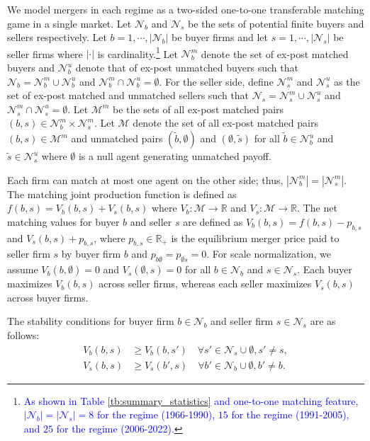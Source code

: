 \documentclass[10pt]{article}
\begin{document}
We model mergers in each regime as a two-sided one-to-one transferable matching game in a single market. Let $\mathcal{N}_b$ and $\mathcal{N}_s$ be the sets of potential finite buyers and sellers respectively. Let $b=1,\cdots,|\mathcal{N}_b|$ be buyer firms and let $s=1,\cdots,|\mathcal{N}_s|$ be seller firms where $|\cdot|$ is cardinality.\footnote{\textcolor{blue}{As shown in Table \ref{tb:summary_statistics} and one-to-one matching feature, $|\mathcal{N}_b|=|\mathcal{N}_s|=8$ for the regime (1966-1990), $15$ for the regime
(1991-2005), and $25$ for the regime (2006-2022).}} Let $\mathcal{N}_{b}^{m}$ denote the set of ex-post matched buyers and $\mathcal{N}_{b}^{u}$ denote that of ex-post unmatched buyers such that $\mathcal{N}_b= \mathcal{N}_{b}^{m}\cup\mathcal{N}_{b}^{u}$ and $\mathcal{N}_{b}^{m}\cap\mathcal{N}_{b}^{u}=\emptyset$. For the seller side, define %
$\mathcal{N}_{s}^{m}$ and $\mathcal{N}_{s}^{u}$ as the set of ex-post matched and unmatched sellers such that $\mathcal{N}_s= \mathcal{N}_{s}^{m}\cup\mathcal{N}_{s}^{u}$ and $\mathcal{N}_{s}^{m}\cap\mathcal{N}_{s}^{u}=\emptyset$. 
Let $\mathcal{M}^m$ be the sets of all ex-post matched pairs $(b,s)\in\mathcal{N}_{b}^{m}\times \mathcal{N}_{s}^{m}$. Let $\mathcal{M}$ denote the set of all ex-post matched pairs $(b,s)\in\mathcal{M}^{m}$ and unmatched pairs $(\tilde{b},\emptyset)$ and $(\emptyset,\tilde{s})$ for all $\tilde{b}\in \mathcal{N}_b^u$ and $\tilde{s}\in \mathcal{N}_s^u$ where $\emptyset$ is a null agent generating unmatched payoff. 

Each firm can match at most one agent on the other side; thus,  $|\mathcal{N}_b^{m}|=|\mathcal{N}_s^{m}|$. The matching joint production function is defined as $f(b,s)=V_b(b,s)+V_s(b,s)$ where $V_b:\mathcal{M}\rightarrow \mathbb{R}$ and $V_s:\mathcal{M}\rightarrow \mathbb{R}$. The net matching values for buyer $b$ and seller $s$ are defined as $V_b(b,s)=f(b,s)-p_{b,s}$ and $V_s(b,s)+p_{b,s}$, where $p_{b,s}\in \mathbb{R}_{+}$ is the equilibrium merger price paid to seller firm $s$ by buyer firm $b$ and $p_{b\emptyset}=p_{\emptyset s}=0$. For scale normalization, we assume $V_b(b,\emptyset)=0$ and $V_s(\emptyset,s)=0$ for all $b\in \mathcal{N}_b$ and $s\in \mathcal{N}_s$. Each buyer maximizes $V_b(b,s)$ across seller firms, whereas each seller maximizes $V_s(b,s)$ across buyer firms. 

The stability conditions for buyer firm $b \in \mathcal{N}_b$ and seller firm $s \in \mathcal{N}_s$ are as follows:
\begin{align}
    V_b(b,s) &\ge V_b(b,s') \quad \forall s' \in \mathcal{N}_s \cup \emptyset,s'\neq s,\label{eq:stability_ineq}\\
    V_s(b,s) &\ge V_s(b',s) \quad \forall b' \in \mathcal{N}_b\cup \emptyset,b'\neq b.\nonumber
\end{align}
\end{document}
